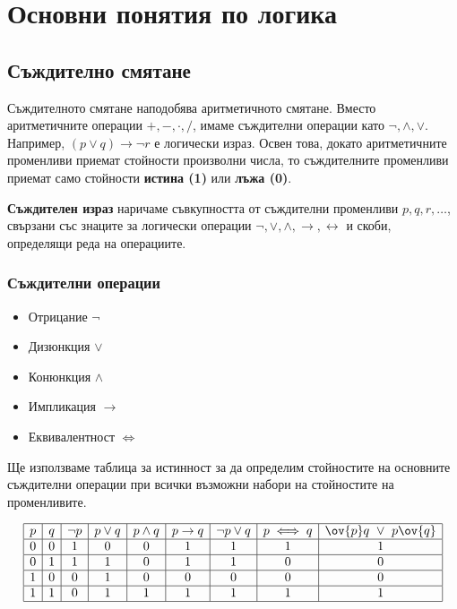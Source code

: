 \chapter{Основни понятия по логика}

\section{Съждително смятане}
\label{sect:propositional}

Съждителното смятане наподобява аритметичното смятане.
Вместо аритметичните операции $+,-,\cdot,/$, имаме съждителни операции като $\neg, \wedge, \vee$.
Например, $(p\vee q)\rightarrow \neg  r$ е логически израз.
Освен това, докато аритметичните променливи приемат стойности произволни числа, то
съждителните променливи приемат само стойности {\bf истина (1)} или {\bf лъжа (0)}.

{\bf Съждителен израз} наричаме съвкупността от съждителни променливи $p,q,r,\dots$, свързани със знаците за логически операции
$\neg, \vee, \wedge, \rightarrow, \leftrightarrow$ и скоби, определящи реда на операциите.

\subsection*{Съждителни операции}

\begin{itemize}
\item
  Отрицание $\neg$
\item 
  Дизюнкция $\vee$
\item
  Конюнкция $\wedge$
\item
  Импликация $\rightarrow$
\item
  Еквивалентност $\iff$
\end{itemize}

Ще използваме таблица за истинност за да определим стойностите на основните съждителни операции
при всички възможни набори на стойностите на променливите.

\[
\begin{array}{|c|c|c|c|c|c|c|c|c|}
  \hline
  p & q & \neg p & p \vee q & p \wedge q & p \rightarrow q & \neg p \vee q & p \iff q & \ov{p}q\ \vee\ p\ov{q} \\
  \hline
  0 & 0 & 1 & 0 & 0 & 1 & 1 & 1 & 1\\
  \hline
  0 & 1 & 1 & 1 & 0 & 1 & 1 & 0 & 0\\
  \hline
  1 & 0 & 0 & 1 & 0 & 0 & 0 & 0 & 0\\
  \hline
  1 & 1 & 0 & 1 & 1 & 1 & 1 & 1 & 1\\
  \hline
\end{array}
\]


